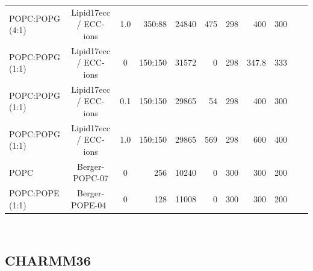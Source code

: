 \documentclass[journal=jpcbfk]{achemso}
\begin{document}
\begin{table}[htb]
\begin{minipage}[t]{\textwidth}
{\begin{tabular}{l c c r r r r r r c c}
      POPC:POPG (4:1)        & Lipid17ecc / ECC-ions \cite{pluharova14,kohagen16,martinek18}     & 1.0& 350:88 & 24840 & 475 &  298  & 400 & 300 & \cite{Lipid17eccPOPCPOPG80201000mMCaCl} \\
      POPC:POPG (1:1)        & Lipid17ecc / ECC-ions \cite{pluharova14,kohagen16,martinek18}     & 0  & 150:150 & 31572 & 0  &  298  & 347.8 & 333 & \cite{Lipid17eccPOPCPOPG5050} \\
      POPC:POPG (1:1)        & Lipid17ecc / ECC-ions \cite{pluharova14,kohagen16,martinek18}     & 0.1& 150:150 & 29865 & 54 &  298  & 400 & 300 & \cite{Lipid17eccPOPCPOPG5050100mMCaCl} \\
      POPC:POPG (1:1)        & Lipid17ecc / ECC-ions \cite{pluharova14,kohagen16,martinek18}     & 1.0& 150:150 & 29865 & 569 &  298  & 600 & 400 & \cite{Lipid17eccPOPCPOPG50501000mMCaCl} \\
      \hline
      POPC             & Berger-POPC-07 \cite{ollila07a} & 0  & 256 & 10240 & 0  &  300  & 300 & 200 & \cite{POPCberger300K} \\
      POPC:POPE (1:1)  & Berger-POPE-04~\cite{devries04}  & 0  & 128 & 11008 & 0  &  300  & 300 & 200 & \cite{POPC1POPE1berger} \\
    \end{tabular}
    }
  \end{minipage}
     \\ %
\end{table}

\clearpage

\subsection{CHARMM36}
\end{document}
